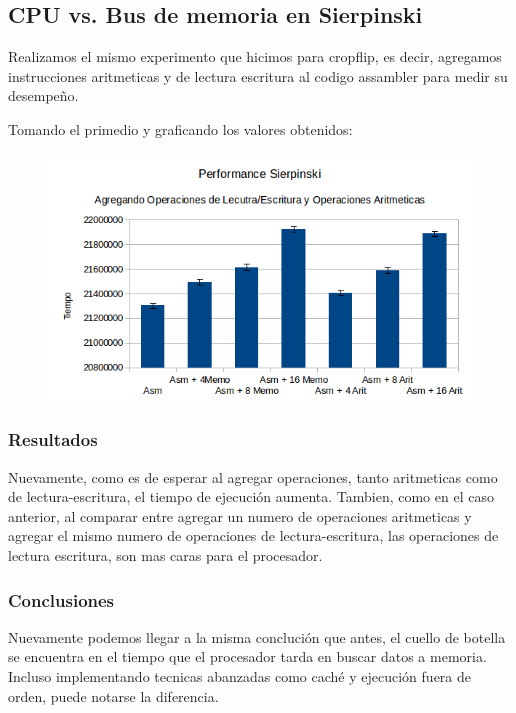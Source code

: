\documentclass[a4paper]{article}
\begin{document}
\newpage
\subsection{CPU vs. Bus de memoria en Sierpinski}

Realizamos el mismo experimento que hicimos para cropflip, es decir, agregamos instrucciones aritmeticas y de lectura escritura al codigo assambler para medir su desempeño.

Tomando el primedio y graficando los valores obtenidos:

\begin{figure}[h!]
  \begin{center}
  \includegraphics[scale=0.66]{Graficos1.5/sie/per.png}
  \label{nombreparareferenciar1}
  \end{center}
\end{figure}

\subsubsection{Resultados}
Nuevamente, como es de esperar al agregar operaciones, tanto aritmeticas como de lectura-escritura, el tiempo de ejecución aumenta. Tambien, como en el caso anterior, al comparar entre agregar un numero de operaciones aritmeticas y agregar el mismo numero de operaciones de lectura-escritura, las operaciones de lectura escritura, son mas caras para el procesador.

\subsubsection{Conclusiones}

Nuevamente podemos llegar a la misma conclución que antes, el cuello de botella se encuentra en el tiempo que el procesador tarda en buscar datos a memoria. Incluso implementando tecnicas abanzadas como caché y ejecución fuera de orden, puede notarse la diferencia. 
\end{document}
